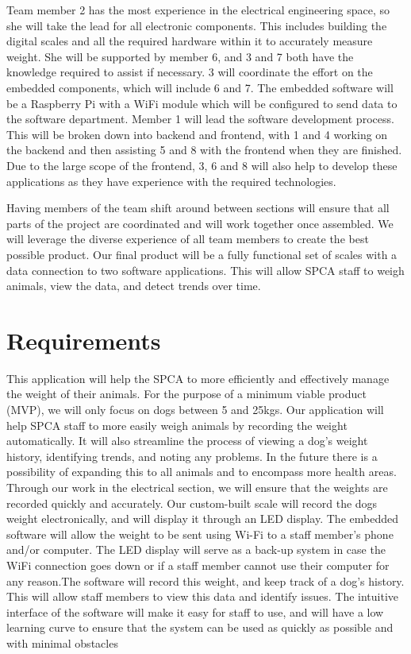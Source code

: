 Team member 2 has the most experience in the electrical engineering space, so she will take the lead for all electronic components. This includes building the digital scales and all the required hardware within it to accurately measure weight. She will be supported by member 6, and 3 and 7 both have the knowledge required to assist if necessary. 3 will coordinate the effort on the embedded components, which will include 6 and 7. The embedded software will be a Raspberry Pi with a WiFi module which will be configured to send data to the software department. Member 1 will lead the software development process. This will be broken down into backend and frontend, with 1 and 4 working on the backend and then assisting 5 and 8 with the frontend when they are finished. Due to the large scope of the frontend, 3, 6 and 8 will also help to develop these applications as they have experience with the required technologies. 

Having members of the team shift around between sections will ensure that all parts of the project are coordinated and will work together once assembled. We will leverage the diverse experience of all team members to create the best possible product. Our final product will be a fully functional set of scales with a data connection to two software applications. This will allow SPCA staff to weigh animals, view the data, and detect trends over time. 


\chapter{Requirements}

This application will help the SPCA to more efficiently and effectively manage the weight of their animals. For the purpose of a minimum viable product (MVP), we will only focus on dogs between 5 and 25kgs. Our application will help SPCA staff to more easily weigh animals by recording the weight automatically. It will also streamline the process of viewing a dog’s weight history, identifying trends, and noting any problems. In the future there is a possibility of expanding this to all animals and to encompass more health areas. 
Through our work in the electrical section, we will ensure that the weights are recorded quickly and accurately. Our custom-built scale will record the dogs weight electronically, and will display it through an LED display. The embedded software will allow the weight to be sent using Wi-Fi to a staff member’s phone and/or computer. The LED display will serve as a back-up system in case the WiFi connection goes down or if a staff member cannot use their computer for any reason.The software will record this weight, and keep track of a dog’s history. This will allow staff members to view this data and identify issues. The intuitive interface of the software will make it easy for staff to use, and will have a low learning curve to ensure that the system can be used as quickly as possible and with minimal obstacles


